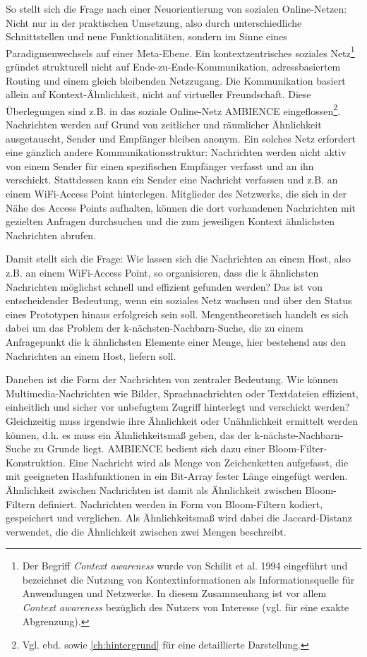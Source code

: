So stellt sich die Frage nach einer Neuorientierung von sozialen Online-Netzen: Nicht nur in der praktischen Umsetzung, also durch unterschiedliche Schnittstellen und neue Funktionalitäten, sondern im  Sinne eines Paradigmenwechsels auf einer Meta-Ebene. Ein kontextzentrisches soziales Netz\footnote{Der Begriff \textit{Context awareness} wurde von Schilit et al. 1994 eingeführt und bezeichnet die Nutzung von Kontextinformationen als Informationsquelle für Anwendungen und Netzwerke. In diesem Zusammenhang ist vor allem \textit{Context awareness} bezüglich des Nutzers von Interesse (vgl. \cite{Werner2015} für eine exakte Abgrenzung).} gründet strukturell nicht auf Ende-zu-Ende-Kommunikation, adressbasiertem  Routing und einem gleich bleibenden Netzzugang. Die Kommunikation basiert allein auf Kontext-Ähnlichkeit, nicht auf virtueller Freundschaft. Diese Überlegungen sind z.B. in das soziale Online-Netz AMBIENCE eingeflossen\footnote{Vgl. ebd. sowie \ref{ch:hintergrund} für eine detaillierte Darstellung.}. Nachrichten werden auf Grund von zeitlicher und räumlicher Ähnlichkeit ausgetauscht, Sender und Empfänger bleiben anonym. Ein solches Netz erfordert eine gänzlich andere Kommunikationsstruktur: Nachrichten werden nicht aktiv von einem Sender für einen spezifischen Empfänger verfasst und an ihn verschickt. Stattdessen kann ein Sender eine Nachricht verfassen und z.B. an einem WiFi-Access Point hinterlegen. Mitglieder des Netzwerks, die sich in der Nähe des Access Points aufhalten, können die dort vorhandenen Nachrichten mit gezielten Anfragen durchsuchen und die zum jeweiligen Kontext ähnlichsten Nachrichten abrufen. 

Damit stellt sich die Frage: Wie lassen sich die Nachrichten an einem Host, also z.B. an einem WiFi-Access Point, so organisieren, dass die k ähnlichsten Nachrichten möglichst schnell und effizient gefunden werden?  Das ist von entscheidender Bedeutung, wenn ein soziales Netz wachsen und über den Status eines Prototypen hinaus erfolgreich sein soll. Mengentheoretisch handelt es sich dabei um das Problem der k-nächsten-Nachbarn-Suche, die zu einem Anfragepunkt die k ähnlichsten Elemente einer Menge, hier bestehend aus den Nachrichten an einem Host, liefern soll. 

Daneben ist die Form der Nachrichten von zentraler Bedeutung. Wie können Multimedia-Nachrichten wie Bilder, Sprachnachrichten oder Textdateien effizient, einheitlich und sicher vor unbefugtem Zugriff hinterlegt und verschickt werden? Gleichzeitig muss irgendwie ihre Ähnlichkeit oder Unähnlichkeit ermittelt werden können, d.h. es muss ein Ähnlichkeitsmaß geben, das der k-nächste-Nachbarn-Suche zu Grunde liegt. AMBIENCE bedient sich dazu einer Bloom-Filter-Konstruktion. Eine Nachricht wird als Menge von Zeichenketten aufgefasst, die mit geeigneten Hashfunktionen in ein Bit-Array fester Länge eingefügt werden. Ähnlichkeit zwischen Nachrichten ist damit als Ähnlichkeit zwischen Bloom-Filtern definiert. Nachrichten werden in Form von Bloom-Filtern kodiert, gespeichert und verglichen. Als Ähnlichkeitsmaß wird dabei die Jaccard-Distanz verwendet, die die Ähnlichkeit zwischen zwei Mengen beschreibt. 

